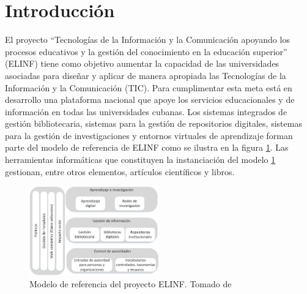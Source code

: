 %
\chapter*{\large Introducción}

\pagestyle{fancy}
\renewcommand{\sectionmark}[1]{\markright{#1}}

\lhead{}
\chead{}
\lfoot{}
\cfoot{}
\rfoot{\thepage}
\renewcommand{\headrulewidth}{0.4pt}

 \def\bibname{\large Introducción}

\pagestyle{fancy}
\lhead{}
\chead{}
\lfoot{}
\cfoot{}
\rfoot{\thepage}
\renewcommand{\headrulewidth}{0.4pt}
\vspace{-1cm}

El proyecto ``Tecnologías de la Información y la Comunicación apoyando los procesos educativos y la gestión del conocimiento en la educación superior'' (ELINF) tiene como objetivo aumentar la capacidad de las universidades asociadas para diseñar y aplicar de manera apropiada las Tecnologías de la Información y la Comunicación (TIC). Para cumplimentar esta meta está en desarrollo una plataforma nacional que apoye los servicios educacionales y de información en todas las universidades cubanas. Los sistemas integrados de gestión bibliotecaria, sistemas para la gestión de repositorios digitales, sistemas para la gestión de investigaciones y entornos virtuales de aprendizaje forman parte del modelo de referencia de ELINF como se ilustra en la figura \ref{fig: referenceModel}. Las herramientas informáticas que constituyen la instanciación del modelo \ref{fig: referenceModel} gestionan, entre otros elementos, artículos científicos y libros.

\begin{figure}
\begin{center}
	\includegraphics[width=0.5\textwidth]{img/referenceModel.png}
\end{center}
\caption{Modelo de referencia del proyecto ELINF. Tomado de \citep{Goovaerts2014}}
\label{fig: referenceModel}
\end{figure}

